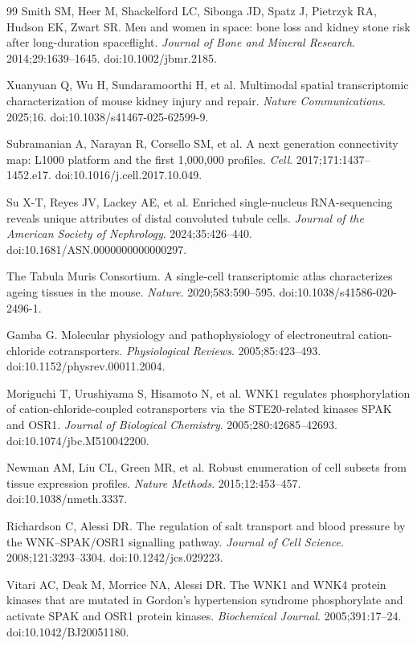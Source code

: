 \documentclass[11pt]{article}
\begin{document}
\begin{thebibliography}{99}
 Smith SM, Heer M, Shackelford LC, Sibonga JD, Spatz J, Pietrzyk RA, Hudson EK, Zwart SR. Men and women in space: bone loss and kidney stone risk after long-duration spaceflight. \emph{Journal of Bone and Mineral Research}. 2014;29:1639--1645. doi:10.1002/jbmr.2185.

 Xuanyuan Q, Wu H, Sundaramoorthi H, et al. Multimodal spatial transcriptomic characterization of mouse kidney injury and repair. \emph{Nature Communications}. 2025;16. doi:10.1038/s41467-025-62599-9.

 Subramanian A, Narayan R, Corsello SM, et al. A next generation connectivity map: L1000 platform and the first 1,000,000 profiles. \emph{Cell}. 2017;171:1437--1452.e17. doi:10.1016/j.cell.2017.10.049.

 Su X-T, Reyes JV, Lackey AE, et al. Enriched single-nucleus RNA-sequencing reveals unique attributes of distal convoluted tubule cells. \emph{Journal of the American Society of Nephrology}. 2024;35:426--440. doi:10.1681/ASN.0000000000000297.

 The Tabula Muris Consortium. A single-cell transcriptomic atlas characterizes ageing tissues in the mouse. \emph{Nature}. 2020;583:590--595. doi:10.1038/s41586-020-2496-1.

 Gamba G. Molecular physiology and pathophysiology of electroneutral cation-chloride cotransporters. \emph{Physiological Reviews}. 2005;85:423--493. doi:10.1152/physrev.00011.2004.

 Moriguchi T, Urushiyama S, Hisamoto N, et al. WNK1 regulates phosphorylation of cation-chloride-coupled cotransporters via the STE20-related kinases SPAK and OSR1. \emph{Journal of Biological Chemistry}. 2005;280:42685--42693. doi:10.1074/jbc.M510042200.

 Newman AM, Liu CL, Green MR, et al. Robust enumeration of cell subsets from tissue expression profiles. \emph{Nature Methods}. 2015;12:453--457. doi:10.1038/nmeth.3337.

 Richardson C, Alessi DR. The regulation of salt transport and blood pressure by the WNK--SPAK/OSR1 signalling pathway. \emph{Journal of Cell Science}. 2008;121:3293--3304. doi:10.1242/jcs.029223.

 Vitari AC, Deak M, Morrice NA, Alessi DR. The WNK1 and WNK4 protein kinases that are mutated in Gordon's hypertension syndrome phosphorylate and activate SPAK and OSR1 protein kinases. \emph{Biochemical Journal}. 2005;391:17--24. doi:10.1042/BJ20051180.


\end{thebibliography}
\end{document}

